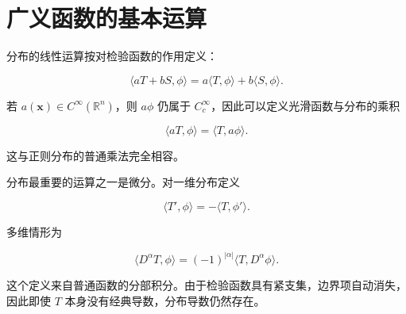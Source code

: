 \section{广义函数的基本运算}
\label{sec:distribution-operations}

分布的线性运算按对检验函数的作用定义：

\[
\langle aT+bS,\phi\rangle
=a\langle T,\phi\rangle+b\langle S,\phi\rangle.
\]

若 $a(\mathbf x)\in C^\infty(\mathbb R^n)$，则 $a\phi$ 仍属于 $C_c^\infty$，因此可以定义光滑函数与分布的乘积

\[
\boxed{
\langle aT,\phi\rangle
=\langle T,a\phi\rangle
}.
\]

这与正则分布的普通乘法完全相容。

分布最重要的运算之一是微分。对一维分布定义

\begin{equation*}\boxed{
\langle T',\phi\rangle=-\langle T,\phi'\rangle
}.\end{equation*}

多维情形为

\[
\boxed{
\langle D^\alpha T,\phi\rangle
=(-1)^{|\alpha|}\langle T,D^\alpha\phi\rangle
}.
\]

这个定义来自普通函数的分部积分。由于检验函数具有紧支集，边界项自动消失，因此即使 $T$ 本身没有经典导数，分布导数仍然存在。

